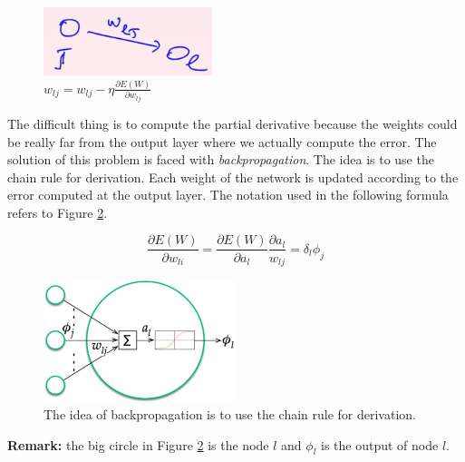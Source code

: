 \begin{figure}
    \centering
    \includegraphics{images/MLP_stochastic_gradient_descent_brutto.png}
    \caption{$w_{lj} = w_{lj} - \eta \frac{\partial E(W)}{\partial w_{lj}}$}
    \label{fig:MLP_stochastic_gradient_descent_brutto}
\end{figure}

The difficult thing is to compute the partial derivative because the weights could be really far from the output layer where we actually compute the error. The solution of this problem is faced with \textit{backpropagation}. The idea is to use the chain rule for derivation. Each weight of the network is updated according to the error computed at the output layer. The notation used in the following formula refers to Figure \ref{fig:backpropagation}.

\begin{equation}
    \frac{\partial E(W)}{\partial w_{li}} = \frac{\partial E(W)}{\partial a_l} \frac{\partial a_l}{w_{lj}} = \delta_l \phi_j
    \label{eq:backpropagation}
\end{equation}

\begin{figure}
    \centering
    \includegraphics[width=0.5\textwidth]{images/backpropagation.png}
    \caption{The idea of backpropagation is to use the chain rule for derivation.}
    \label{fig:backpropagation}
\end{figure}

\textbf{Remark:} the big circle in Figure \ref{fig:backpropagation} is the node $l$ and $\phi_l$ is the output of node $l$. \newline

